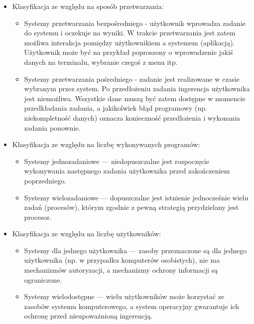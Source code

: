 \documentclass[12pt,a4paper]{article}
\begin{document}
	\begin{itemize}
		\item Klasyfikacja ze względu na sposób przetwarzania:
		\begin{itemize}
			\item Systemy przetwarzania bezpośredniego - użytkownik wprowadza zadanie do systemu i oczekuje na wyniki. W trakcie przetwarzania jest zatem możliwa interakcja pomiędzy użytkownikiem a systemem (aplikacją). Użytkownik może być na przykład poproszony o wprowadzenie jakiś danych na terminalu, wybranie czegoś z menu itp.
			\item Systemy przetwarzania pośredniego -  zadanie jest realizowane w czasie wybranym przez system. Po przedłożeniu zadania ingerencja użytkownika jest niemożliwa. Wszystkie dane muszą być zatem dostępne w momencie przedkładania zadania, a jakikolwiek błąd programowy (np. niekompletność danych) oznacza konieczność przedłożenia i wykonania zadania ponownie.
		\end{itemize}
	
		\item Klasyfikacja ze względu na liczbę wykonywanych programów:
		\begin{itemize}
			\item  Systemy jednozadaniowe — niedopuszczalne jest rozpoczęcie wykonywania następnego zadania użytkownika przed zakończeniem poprzedniego.
			\item Systemy wielozadaniowe — dopuszczalne jest istnienie jednocześnie wielu zadań (procesów), którym zgodnie z pewną strategią przydzielany jest procesor.
		\end{itemize}
	
		\item Klasyfikacja ze względu na liczbę użytkowników:
		\begin{itemize}
			\item Systemy dla jednego użytkownika — zasoby przeznaczone są dla jednego użytkownika (np. w przypadku komputerów osobistych), nie ma mechanizmów autoryzacji, a mechanizmy ochrony informacji są ograniczone.
			\item Systemy wielodostępne — wielu użytkowników może korzystać ze zasobów systemu komputerowego, a system operacyjny gwarantuje ich ochronę przed nieupoważnioną ingerencją.
		\end{itemize}
	

\end{itemize}
\end{document}
